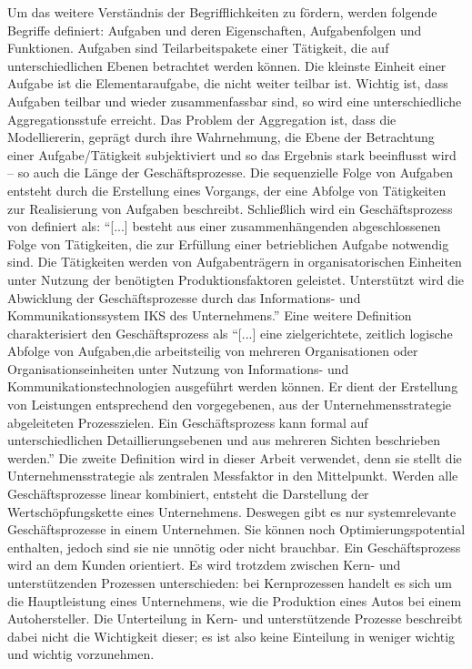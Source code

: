 Um das weitere Verständnis der Begrifflichkeiten zu fördern, werden folgende Begriffe definiert\autocite[vgl.][S.4-5]{staud_geschaftsprozessanalyse_2006}: Aufgaben und deren Eigenschaften, Aufgabenfolgen und Funktionen. Aufgaben sind Teilarbeitspakete einer Tätigkeit, die auf unterschiedlichen Ebenen betrachtet werden können. Die kleinste Einheit einer Aufgabe ist die Elementaraufgabe, die nicht weiter teilbar ist. Wichtig ist, dass Aufgaben teilbar und wieder zusammenfassbar sind, so wird eine unterschiedliche Aggregationsstufe erreicht. Das Problem der Aggregation ist, dass die Modelliererin, geprägt durch ihre Wahrnehmung, die Ebene der Betrachtung einer Aufgabe/Tätigkeit subjektiviert und so das Ergebnis stark beeinflusst wird -- so auch die Länge der Geschäftsprozesse. Die sequenzielle Folge von Aufgaben entsteht durch die Erstellung eines Vorgangs, der eine Abfolge von Tätigkeiten zur Realisierung von Aufgaben beschreibt. Schließlich wird ein Geschäftsprozess von \cite{staud_geschaftsprozessanalyse_2006} definiert als: \enquote{[...] besteht aus einer zusammenhängenden abgeschlossenen Folge von Tätigkeiten, die zur Erfüllung einer betrieblichen Aufgabe notwendig sind. Die Tätigkeiten werden von Aufgabenträgern in organisatorischen Einheiten unter Nutzung der benötigten Produktionsfaktoren geleistet. Unterstützt wird die Abwicklung der Geschäftsprozesse durch das Informations- und Kommunikationssystem IKS des Unternehmens.}\autocite[][S.9]{staud_geschaftsprozessanalyse_2006} Eine weitere Definition charakterisiert den Geschäftsprozess als \enquote{[...] eine zielgerichtete, zeitlich logische Abfolge von Aufgaben,die arbeitsteilig von mehreren Organisationen oder Organisationseinheiten unter Nutzung von Informations- und Kommunikationstechnologien ausgeführt werden können. Er dient der Erstellung von Leistungen entsprechend den vorgegebenen, aus der Unternehmensstrategie abgeleiteten Prozesszielen. Ein Geschäftsprozess kann formal auf unterschiedlichen Detaillierungsebenen und aus mehreren Sichten beschrieben werden.}\autocite[][S.41]{gadatsch_grundkurs_2010} Die zweite Definition wird in dieser Arbeit verwendet, denn sie stellt die Unternehmensstrategie als zentralen Messfaktor in den Mittelpunkt. Werden alle Geschäftsprozesse linear kombiniert, entsteht die Darstellung der Wertschöpfungskette eines Unternehmens. Deswegen gibt es nur systemrelevante Geschäftsprozesse in einem Unternehmen. Sie können noch Optimierungspotential enthalten, jedoch sind sie nie unnötig oder nicht brauchbar. Ein Geschäftsprozess wird an dem Kunden orientiert. Es wird trotzdem zwischen Kern- und unterstützenden Prozessen unterschieden: bei Kernprozessen handelt es sich um die Hauptleistung eines Unternehmens, wie die Produktion eines Autos bei einem Autohersteller. Die Unterteilung in Kern- und unterstützende Prozesse beschreibt dabei nicht die Wichtigkeit dieser; es ist also keine Einteilung in weniger wichtig und wichtig vorzunehmen.\autocite[vgl.][S.11]{staud_geschaftsprozessanalyse_2006} \par

